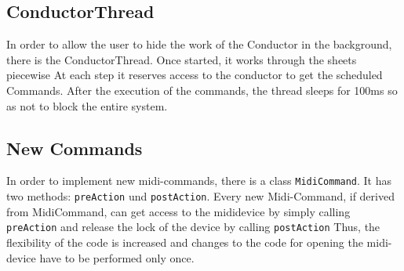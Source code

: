 \documentclass[10pt,a4paper]{article}
\begin{document}
\subsection{ConductorThread}
In order to allow the user to hide the work of the Conductor in the background, 
there is the ConductorThread. Once started, it works through the sheets piecewise
At each step it reserves access to the conductor to get the scheduled
Commands. After the execution of the commands, the thread sleeps for 100ms so as not to
block the entire system. 

\subsection{New Commands}
In order to implement new midi-commands, there is a class \lstinline|MidiCommand|. It has
two methods: \lstinline|preAction| und \lstinline|postAction|. Every new
Midi-Command, if derived from MidiCommand, can get access to the mididevice by simply
calling \lstinline|preAction| and release the lock of the device by calling \lstinline|postAction|
Thus, the flexibility of the code is increased and changes to the code for opening the
midi-device have to be performed only once. 


\end{document}
